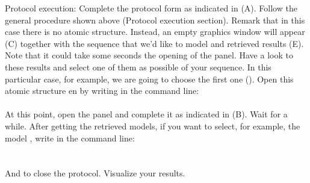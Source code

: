 \begin{itemize}
                Protocol execution: Complete the protocol form as indicated in  (A). Follow the general procedure shown above (Protocol execution section). Remark that in this case there is no  atomic structure. Instead, an empty \chimera graphics window will appear (C) together with the  sequence that we'd like to model and  retrieved results (E). Note that it could take some seconds the opening of the  panel. Have a look to these results and select one of them as possible  of your  sequence. In this particular case, for example, we are going to choose the first one (). Open this atomic structure en \chimera by writing in the command line:\\
                \\
                At this point, open the  panel and complete it as indicated in  (B). Wait for a while. After getting the retrieved models, if you want to select, for example, the  model , write in the command line:\\
                \\
                \\
                And \chimera {} to close the protocol. Visualize your results.
                            
\end{itemize}
